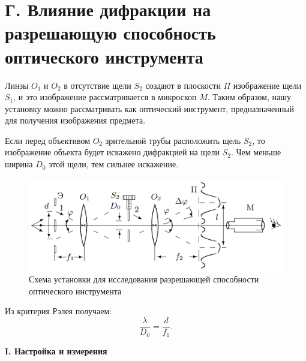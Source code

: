 \documentclass[12pt,a4paper]{article}
\begin{document}
	\section*{Г. Влияние дифракции на разрешающую способность оптического инструмента}
	
	Линзы $O_1$ и $O_2$ в отсутствие щели $S_2$ создают в плоскости $\Pi$ изображение щели $S_1$, и это изображение рассматривается в микроскоп $M$. Таким образом, нашу установку можно рассматривать как оптический инструмент, предназначенный для получения изображения предмета.
	
	Если перед объективом $O_2$ зрительной трубы расположить щель $S_2$, то изображение объекта будет искажено дифракцией на щели $S_2$. Чем меньше ширина $D_0$ этой щели, тем сильнее искажение.

	\begin{figure}[h!]
		\centering
		\includegraphics[scale=0.5]{res/Rasr}
		\caption{Схема установки для исследования разрешающей способности оптического инструмента}
	\end{figure}

	Из критерия Рэлея получаем:
	\begin{equation*}
		\frac{\lambda}{D_0} = \frac{d}{f_1}.
	\end{equation*}

	\newpage
	\begin{center}
		\textbf{I. Настройка и измерения}
	\end{center}
\end{document}
